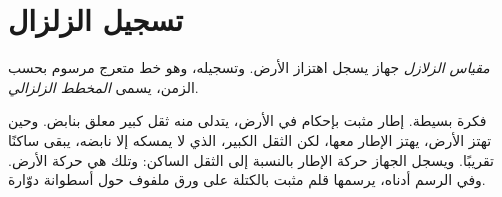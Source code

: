 \section{تسجيل الزلزال}

\begin{definition}\label{def:g7:earthquakes:seismometer}
\emph{مقياس الزلازل} جهاز يسجل اهتزاز الأرض. وتسجيله،
وهو خط متعرج مرسوم بحسب الزمن، يسمى \emph{المخطط الزلزالي}.
\end{definition}

فكرة  بسيطة. إطار مثبت بإحكام في الأرض، يتدلى منه ثقل كبير
معلق بنابض. وحين تهتز الأرض، يهتز الإطار معها، لكن الثقل الكبير، الذي
لا يمسكه إلا نابضه، يبقى ساكنًا تقريبًا. ويسجل الجهاز حركة الإطار
بالنسبة إلى الثقل الساكن: وتلك هي حركة الأرض. وفي الرسم أدناه، يرسمها
قلم مثبت بالكتلة على ورق ملفوف حول أسطوانة دوّارة.

